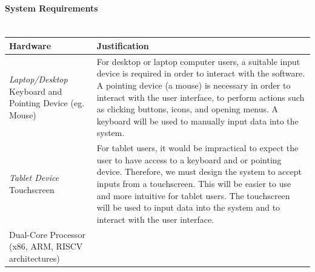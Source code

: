 \documentclass{article}
\begin{document}
\paragraph{System Requirements\\\\}

\begin{tabular}{ |p{}|p{}| }
    \hline
    \textbf{Hardware}                                    & \textbf{Justification}                                                                                                                                                                                                                                                   \\
    \hline
    \textit{Laptop/Desktop}\newline
    Keyboard and Pointing Device (eg. Mouse)             &
    For desktop or laptop computer users, a suitable input device is required in order to interact with the software.\newline
    A pointing device (a mouse) is necessary in order to interact with the user interface, to perform actions such as clicking buttons, icons, and opening menus.\newline
    A keyboard will be used to manually input data into the system.                                                                                                                                                                                                                                                                 \\
    \hline
    \textit{Tablet Device}\newline
    Touchscreen                                          & For tablet users, it would be impractical to expect the user to have access to a keyboard and or pointing device. Therefore, we must design the system to accept inputs from a touchscreen.\newline
    This will be easier to use and more intuitive for tablet users. \newline
    The touchscreen will be used to input data into the system and to interact with the user interface.                                                                                                                                                                                                                             \\
    \hline
    Dual-Core Processor
    \newline(x86, ARM, RISCV architectures)              &

\end{tabular}
\end{document}
